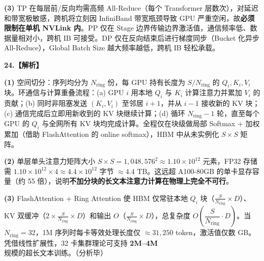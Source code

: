 \documentclass[a4paper]{ctexart}
\begin{document}
\vspace{0.4em}
\textbf{(3)} TP 在每层前/反向均需高频 All-Reduce（每个 Transformer 层数次），对延迟和带宽极敏感，跨机将立刻因 InfiniBand 带宽瓶颈导致 GPU 严重空闲，故\textbf{必须限制在单机 NVLink 内}。PP 仅在 Stage 边界传输边界激活值，通信频率低、数据量相对小，跨机 IB 可接受。DP 仅在反向结束后进行梯度同步（Bucket 化异步 All-Reduce），Global Batch Size 越大频率越低，跨机 IB 轻松承载。

\vspace{0.8em}

\noindent\textbf{24.【解析】}

\textbf{(1)} 空间切分：序列均分为 $N_{\mathrm{ring}}$ 份，每 GPU 持有长度为 $S/N_{\mathrm{ring}}$ 的 $Q_i,K_i,V_i$ 块。环通信与计算重叠流程：(a) GPU $i$ 用本地 $Q_i$ 与 $K_i$ 计算注意力并累加 $V_i$ 的贡献；(b) 同时非阻塞发送 $(K_i,V_i)$ 至邻居 $i+1$，并从 $i-1$ 接收新的 KV 块；(c) 通信完成后立即用新收到的 KV 块继续计算；(d) 循环 $N_{\mathrm{ring}}-1$ 轮，直至每个 GPU 的 $Q_i$ 与全网所有 KV 块均完成计算。全程仅在块级做局部 Softmax + 加权累加（借助 FlashAttention 的 online softmax），HBM 中从未实例化 $S\times S$ 矩阵。

\vspace{0.4em}
\textbf{(2)} 单层单头注意力矩阵大小 $S\times S=1{,}048{,}576^2\approx1.10\times10^{12}$ 元素，FP32 存储需 $1.10\times10^{12}\times4\approx4.4\times10^{12}$ 字节 $\approx4.4$ TB。这远超 A100-80GB 的单卡显存容量（约 55 倍），说明\textbf{不加分块的长文本注意力计算在物理上完全不可行}。

\vspace{0.4em}
\textbf{(3)} FlashAttention + Ring Attention 使 HBM 仅常驻本地 $Q_i$ 块（$\frac{S}{N_{\mathrm{ring}}}\times D$）、KV 双缓冲（$2\times\frac{S}{N_{\mathrm{ring}}}\times D$）和输出 $O$（$\frac{S}{N_{\mathrm{ring}}}\times D$），总复杂度 $O\!\left(\dfrac{S}{N_{\mathrm{ring}}}\cdot D\right)$。当 $N_{\mathrm{ring}}=32$，1M 序列时每卡等效处理长度仅 $\approx31{,}250$ token，激活值仅数 GB。凭借线性扩展性，32 卡集群理论可支持 \textbf{2M--4M} 规模的超长文本训练。\quad（分析毕）
\end{document}
